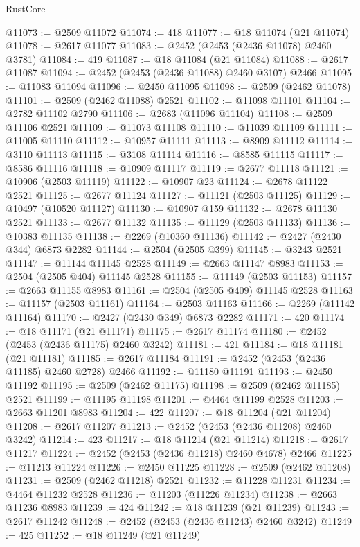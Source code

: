 \begin{lexlean}{RustCore}
\begin{coremodule}
@11073 := @2509 @11072
@11074 := 418
@11077 := @18 @11074 (@21 @11074)
@11078 := @2617 @11077
@11083 := @2452 (@2453 (@2436 @11078) @2460 @3781)
@11084 := 419
@11087 := @18 @11084 (@21 @11084)
@11088 := @2617 @11087
@11094 := @2452 (@2453 (@2436 @11088) @2460 @3107) @2466
@11095 := @11083 @11094
@11096 := @2450 @11095
@11098 := @2509 (@2462 @11078)
@11101 := @2509 (@2462 @11088) @2521
@11102 := @11098 @11101
@11104 := @2782 @11102 @2790
@11106 := @2683 (@11096 @11104)
@11108 := @2509 @11106 @2521
@11109 := @11073 @11108
@11110 := @11039 @11109
@11111 := @11005 @11110
@11112 := @10957 @11111
@11113 := @8909 @11112
@11114 := @3110 @11113
@11115 := @3108 @11114
@11116 := @8585 @11115
@11117 := @8586 @11116
@11118 := @10909 @11117
@11119 := @2677 @11118
@11121 := @10906 (@2503 @11119)
@11122 := @10907 @23
@11124 := @2678 @11122 @2521
@11125 := @2677 @11124
@11127 := @11121 (@2503 @11125)
@11129 := @10497 (@10520 @11127)
@11130 := @10907 @159
@11132 := @2678 @11130 @2521
@11133 := @2677 @11132
@11135 := @11129 (@2503 @11133)
@11136 := @10383 @11135
@11138 := @2269 (@10360 @11136)
@11142 := @2427 (@2430 @344) @6873 @2282
@11144 := @2504 (@2505 @399)
@11145 := @3243 @2521
@11147 := @11144 @11145 @2528
@11149 := @2663 @11147 @8983
@11153 := @2504 (@2505 @404) @11145 @2528
@11155 := @11149 (@2503 @11153)
@11157 := @2663 @11155 @8983
@11161 := @2504 (@2505 @409) @11145 @2528
@11163 := @11157 (@2503 @11161)
@11164 := @2503 @11163
@11166 := @2269 (@11142 @11164)
@11170 := @2427 (@2430 @349) @6873 @2282
@11171 := 420
@11174 := @18 @11171 (@21 @11171)
@11175 := @2617 @11174
@11180 := @2452 (@2453 (@2436 @11175) @2460 @3242)
@11181 := 421
@11184 := @18 @11181 (@21 @11181)
@11185 := @2617 @11184
@11191 := @2452 (@2453 (@2436 @11185) @2460 @2728) @2466
@11192 := @11180 @11191
@11193 := @2450 @11192
@11195 := @2509 (@2462 @11175)
@11198 := @2509 (@2462 @11185) @2521
@11199 := @11195 @11198
@11201 := @4464 @11199 @2528
@11203 := @2663 @11201 @8983
@11204 := 422
@11207 := @18 @11204 (@21 @11204)
@11208 := @2617 @11207
@11213 := @2452 (@2453 (@2436 @11208) @2460 @3242)
@11214 := 423
@11217 := @18 @11214 (@21 @11214)
@11218 := @2617 @11217
@11224 := @2452 (@2453 (@2436 @11218) @2460 @4678) @2466
@11225 := @11213 @11224
@11226 := @2450 @11225
@11228 := @2509 (@2462 @11208)
@11231 := @2509 (@2462 @11218) @2521
@11232 := @11228 @11231
@11234 := @4464 @11232 @2528
@11236 := @11203 (@11226 @11234)
@11238 := @2663 @11236 @8983
@11239 := 424
@11242 := @18 @11239 (@21 @11239)
@11243 := @2617 @11242
@11248 := @2452 (@2453 (@2436 @11243) @2460 @3242)
@11249 := 425
@11252 := @18 @11249 (@21 @11249)

\end{coremodule}
\end{lexlean}
